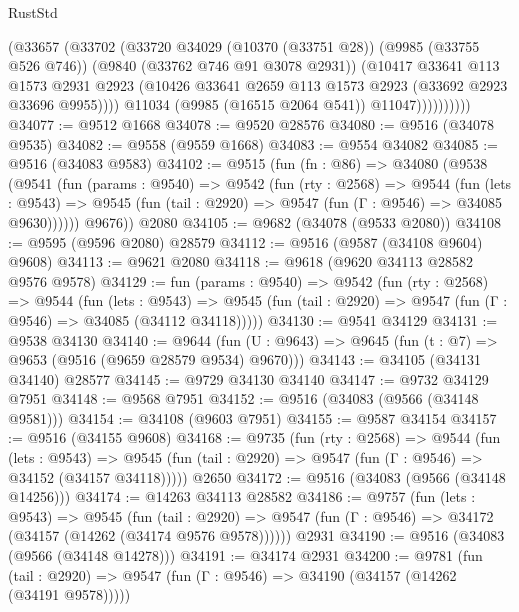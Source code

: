 \begin{lexlean}{RustStd}
\begin{coremodule}
                    (@33657
                      (@33702
                        (@33720
                          @34029
                          (@10370 (@33751 @28))
                          (@9985 (@33755 @526 @746))
                          (@9840 (@33762 @746 @91 @3078 @2931))
                          (@10417
                            @33641
                            @113
                            @1573
                            @2931
                            @2923
                            (@10426 @33641 @2659 @113 @1573 @2923 (@33692 @2923 @33696 @9955))))
                        @11034
                        (@9985 (@16515 @2064 @541))
                        @11047))))))))))
@34077 := @9512 @1668
@34078 := @9520 @28576
@34080 := @9516 (@34078 @9535)
@34082 := @9558 (@9559 @1668)
@34083 := @9554 @34082
@34085 := @9516 (@34083 @9583)
@34102 := @9515
    (fun (fn : @86) =>
    @34080
      (@9538
        (@9541
          (fun (params : @9540) =>
          @9542
            (fun (rty : @2568) =>
            @9544
              (fun (lets : @9543) =>
              @9545 (fun (tail : @2920) => @9547 (fun (Γ : @9546) => @34085 @9630))))))
        @9676))
    @2080
@34105 := @9682 (@34078 (@9533 @2080))
@34108 := @9595 (@9596 @2080) @28579
@34112 := @9516 (@9587 (@34108 @9604) @9608)
@34113 := @9621 @2080
@34118 := @9618 (@9620 @34113 @28582 @9576 @9578)
@34129 := fun (params : @9540) =>
  @9542
    (fun (rty : @2568) =>
    @9544
      (fun (lets : @9543) =>
      @9545 (fun (tail : @2920) => @9547 (fun (Γ : @9546) => @34085 (@34112 @34118)))))
@34130 := @9541 @34129
@34131 := @9538 @34130
@34140 := @9644
    (fun (U : @9643) => @9645 (fun (t : @7) => @9653 (@9516 (@9659 @28579 @9534) @9670)))
@34143 := @34105 (@34131 @34140) @28577
@34145 := @9729 @34130 @34140
@34147 := @9732 @34129 @7951
@34148 := @9568 @7951
@34152 := @9516 (@34083 (@9566 (@34148 @9581)))
@34154 := @34108 (@9603 @7951)
@34155 := @9587 @34154
@34157 := @9516 (@34155 @9608)
@34168 := @9735
    (fun (rty : @2568) =>
    @9544
      (fun (lets : @9543) =>
      @9545 (fun (tail : @2920) => @9547 (fun (Γ : @9546) => @34152 (@34157 @34118)))))
    @2650
@34172 := @9516 (@34083 (@9566 (@34148 @14256)))
@34174 := @14263 @34113 @28582
@34186 := @9757
    (fun (lets : @9543) =>
    @9545
      (fun (tail : @2920) =>
      @9547 (fun (Γ : @9546) => @34172 (@34157 (@14262 (@34174 @9576 @9578))))))
    @2931
@34190 := @9516 (@34083 (@9566 (@34148 @14278)))
@34191 := @34174 @2931
@34200 := @9781
    (fun (tail : @2920) => @9547 (fun (Γ : @9546) => @34190 (@34157 (@14262 (@34191 @9578)))))

\end{coremodule}
\end{lexlean}
